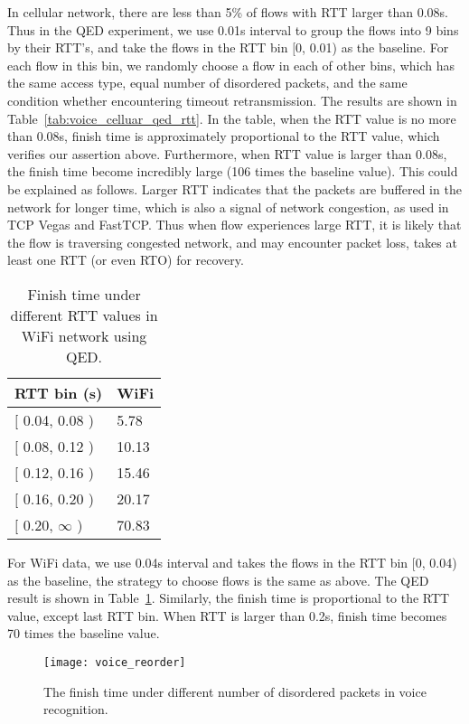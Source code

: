 In cellular network, there are less than 5\% of flows with RTT larger than 0.08s. Thus in the QED experiment, we use 0.01s interval to group the flows into 9 bins by their RTT's, and take the flows in the RTT bin $[$0, 0.01) as the baseline. For each flow in this bin, we randomly choose a flow in each of other bins, which has the same access type, equal number of disordered packets, and the same condition whether encountering timeout retransmission. The results are shown in Table~\ref{tab:voice_celluar_qed_rtt}. In the table, when the RTT value is no more than 0.08s, finish time is approximately proportional to the RTT value, which verifies our assertion above. Furthermore, when RTT value is larger than 0.08s, the finish time become incredibly large (106 times the baseline value). This could be explained as follows. Larger RTT indicates that the packets are buffered in the network for longer time, which is also a signal of network congestion, as used in TCP Vegas\cite{brakmo1995tcp} and FastTCP\cite{wei2006fast}. Thus when flow experiences large RTT, it is likely that the flow is traversing congested network, and may encounter packet loss, takes at least one RTT (or even RTO) for recovery.

\begin{table}[th]
\caption{Finish time under different RTT values in WiFi network using QED.}
\label{tab:voice_wifi_qed_rtt}
\centering
\renewcommand{\arraystretch}{1.2}
\begin{tabular}{l|l}
	\toprule
	RTT bin (s) & WiFi \\
	\midrule
	$[$ 0.04, 0.08 ) & 5.78 \\
	\hline
	$[$ 0.08, 0.12 ) & 10.13 \\
	\hline
	$[$ 0.12, 0.16 ) & 15.46 \\
	\hline
	$[$ 0.16, 0.20 ) & 20.17 \\
	\hline
	$[$ 0.20, $\infty$ ) & 70.83 \\
	\bottomrule
\end{tabular}
\end{table}

For WiFi data, we use 0.04s interval and takes the flows in the RTT bin $[$0, 0.04) as the baseline, the strategy to choose flows is the same as above. The QED result is shown in Table~\ref{tab:voice_wifi_qed_rtt}. Similarly, the finish time is proportional to the RTT value, except last RTT bin. When RTT is larger than 0.2s, finish time becomes 70 times the baseline value.

\begin{figure}[th]
\centering
\texttt{[image: voice\_reorder]}
\caption{The finish time under different number of disordered packets in voice recognition.}
\label{fig:voice_reorder}
\end{figure}

